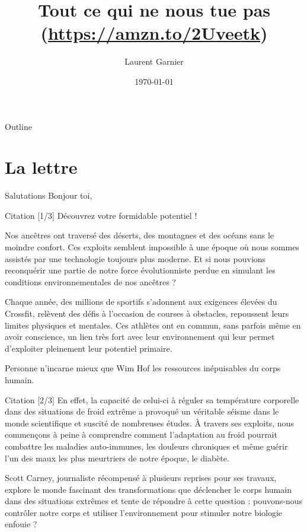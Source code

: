 \documentclass[presentation]{beamer}
\author{Laurent Garnier}
\date{\today}
\title{Tout ce qui ne nous tue pas (\url{https://amzn.to/2Uveetk})}
\begin{document}
\maketitle
\begin{frame}{Outline}
\tableofcontents
\end{frame}



\section{La lettre}
\label{sec:org192a9bb}
\begin{frame}[label={sec:org5888f43}]{Salutations}
Bonjour toi,
\end{frame}


\begin{frame}[label={sec:org9ae2524}]{Citation [1/3]}
Découvrez votre formidable potentiel !

Nos ancêtres ont traversé des déserts, des montagnes et des océans sans le moindre confort. Ces exploits semblent impossible à une époque où nous sommes assistés par une technologie toujours plus moderne. Et si nous pouvions reconquérir une partie de notre force évolutionniste perdue en simulant les conditions environnementales de nos ancêtres ?

Chaque année, des millions de sportifs s'adonnent aux exigences élevées du Crossfit, relèvent des défis à l'occasion de courses à obstacles, repoussent leurs limites physiques et mentales. Ces athlètes ont en commun, sans parfois même en avoir conscience, un lien très fort avec leur environnement qui leur permet d'exploiter pleinement leur potentiel primaire.

Personne n'incarne mieux que Wim Hof les ressources inépuisables du corps humain.
\end{frame}

\begin{frame}[label={sec:org178279e}]{Citation [2/3]}
En effet, la capacité de celui-ci à réguler sa température corporelle dans des situations de froid extrême a provoqué un véritable séisme dans le monde scientifique et suscité de nombreuses études. À travers ses exploits, nous commençons à peine à comprendre comment l'adaptation au froid pourrait combattre les maladies auto-immunes, les douleurs chroniques et même guérir l'un des maux les plus meurtriers de notre époque, le diabète.

Scott Carney, journaliste récompensé à plusieurs reprises pour ses travaux, explore le monde fascinant des transformations que déclencher le corps humain dans des situations extrêmes et tente de répondre à cette question : pouvons-nous contrôler notre corps et utiliser l'environnement pour stimuler notre biologie enfouie ?
\end{frame}
\end{document}
